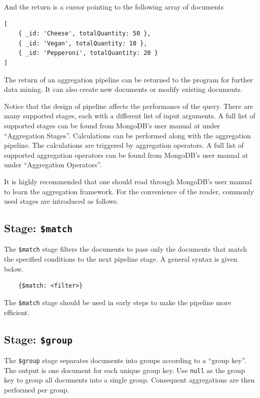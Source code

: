 And the return is a cursor pointing to the following array of documents
\begin{lstlisting}
[
	{ _id: 'Cheese', totalQuantity: 50 },
	{ _id: 'Vegan', totalQuantity: 10 },
	{ _id: 'Pepperoni', totalQuantity: 20 }
]
\end{lstlisting}
The return of an aggregation pipeline can be returned to the program for further data mining. It can also create new documents or modify existing documents.

Notice that the design of pipeline affects the performance of the query. There are many supported stages, each with a different list of input arguments. A full list of supported stages can be found from MongoDB's user manual at \cite{mongodb2024aggregation}
under ``Aggregation Stages''. Calculations can be performed along with the aggregation pipeline. The calculations are triggered by aggregation operators. A full list of supported aggregation operators can be found from MongoDB's user manual at \cite{mongodb2024aggregationoperators} under ``Aggregation Operators''.

It is highly recommended that one should read through MongoDB's user manual to learn the aggregation framework. For the convenience of the reader, commonly used stages are introduced as follows.

\subsection{Stage: \texttt{\$match}}

The \verb|$match| stage filters the documents to pass only the documents that match the specified conditions to the next pipeline stage. A general syntax is given below.
\begin{lstlisting}
	{$match: <filter>}
\end{lstlisting}

The \verb|$match| stage should be used in early steps to make the pipeline more efficient.

\subsection{Stage: \texttt{\$group}}

The \verb|$group| stage separates documents into groups according to a ``group key''. The output is one document for each unique group key. Use \verb|null| as the group key to group all documents into a single group. Consequent aggregations are then performed per group.

